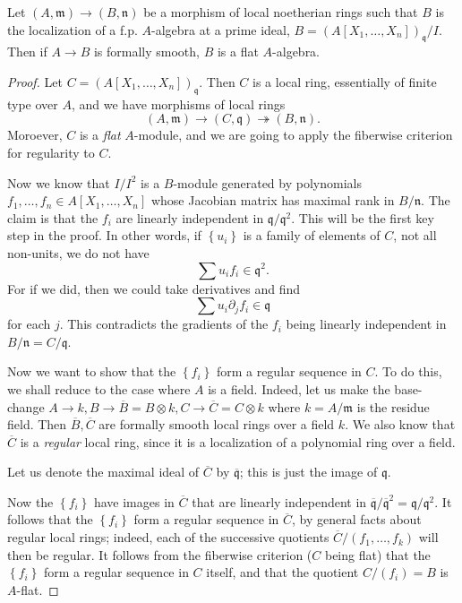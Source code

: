 \begin{theorem}[EGA IV 17.5.1] Let $(A, \mathfrak{m}) \to (B, \mathfrak{n})$ be
a morphism of local noetherian rings such that $B$ is the localization of a f.p. $A$-algebra at a prime
ideal, $B = (A[X_1, \dots, X_n])_{\mathfrak{q}}/I$. Then if $A \to B$ is formally smooth, $B$ is a flat $A$-algebra.
\end{theorem} 
\begin{proof} 
Let $C = (A[X_1, \dots, X_n])_{\mathfrak{q}}$. Then $C$ is a local ring,
essentially of finite type over $A$, and we have morphisms of local rings
\[ (A, \mathfrak{m}) \to (C, \mathfrak{q}) \twoheadrightarrow (B,
\mathfrak{n}).  \]
Moroever, $C$ is a \emph{flat} $A$-module, and we are going to apply the
fiberwise criterion for regularity to $C$.

Now we know that $I/I^2$ is a $B$-module generated by polynomials $f_1, \dots, f_n
\in A[X_1, \dots, X_n]$
whose Jacobian matrix has maximal rank in $B/\mathfrak{n}$.
The claim is that the $f_i$ are linearly independent in
$\mathfrak{q}/\mathfrak{q}^2$. This will be the first key step in the proof.
In other words, if $\left\{u_i\right\}$ is a family of elements of $C$, not all
non-units, we do not have
\[ \sum u_i f_i \in \mathfrak{q}^2.  \]
For if we did, then we could take derivatives
and find
\[ \sum u_i \partial_j f_i \in \mathfrak{q}  \]
for each $j$. This contradicts the gradients of the $f_i$ being linearly
independent in $B/\mathfrak{n} = C/\mathfrak{q}$. 

Now we want to show that the $\left\{f_i\right\}$ form a regular sequence in
$C$. To do this, we shall reduce to the case where $A$ is a field. Indeed, let
us make the base-change $A \to k, B \to \overline{B} = B \otimes k, C \to \overline{C}=C \otimes k$ where $k  =
A/\mathfrak{m}$ is the residue field.
Then $\overline{B},\overline{C}$ are  formally smooth local rings over a
field $k$. We also know that $\overline{C}$ is a \emph{regular} local ring,
since it is a localization of a polynomial ring over a field. 


Let us denote the maximal ideal of
$\overline{C}$ by
$\overline{\mathfrak{q}}$; this is just the image of $\mathfrak{q}$.


Now the $\left\{f_i\right\}$ have images in $\overline{C}$ that are linearly
independent
in $\overline{\mathfrak{q}}/\overline{\mathfrak{q}}^2 =
\mathfrak{q}/\mathfrak{q}^2$. It follows that the $\left\{f_i\right\}$ form a
regular sequence in $\overline{C}$, by general facts about regular local
rings; indeed, each of the successive quotients $\overline{C}/(f_1, \dots,
f_k)$ will then be regular.
It follows from the fiberwise criterion ($C$ being flat) that the
$\left\{f_i\right\}$ form a regular sequence in $C$ itself, and that the
quotient $C/(f_i) = B$ is $A$-flat.
\end{proof} 

